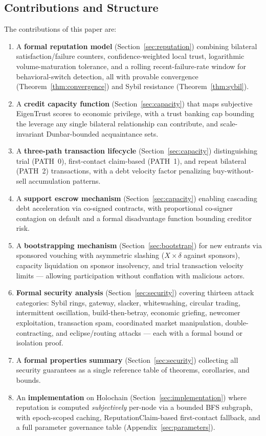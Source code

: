 \documentclass[11pt]{article}
\begin{document}
\subsection{Contributions and Structure}
The contributions of this paper are:
\begin{enumerate}
    \item A \textbf{formal reputation model} (Section~\ref{sec:reputation}) combining bilateral satisfaction/failure counters, confidence-weighted local trust, logarithmic volume-maturation tolerance, and a rolling recent-failure-rate window for behavioral-switch detection, all with provable convergence (Theorem~\ref{thm:convergence}) and Sybil resistance (Theorem~\ref{thm:sybil}).
    \item A \textbf{credit capacity function} (Section~\ref{sec:capacity}) that maps subjective EigenTrust scores to economic privilege, with a trust banking cap bounding the leverage any single bilateral relationship can contribute, and scale-invariant Dunbar-bounded acquaintance sets.
    \item A \textbf{three-path transaction lifecycle} (Section~\ref{sec:capacity}) distinguishing trial (PATH~0), first-contact claim-based (PATH~1), and repeat bilateral (PATH~2) transactions, with a debt velocity factor penalizing buy-without-sell accumulation patterns.
    \item A \textbf{support escrow mechanism} (Section~\ref{sec:capacity}) enabling cascading debt acceleration via co-signed contracts, with proportional co-signer contagion on default and a formal disadvantage function bounding creditor risk.
    \item A \textbf{bootstrapping mechanism} (Section~\ref{sec:bootstrap}) for new entrants via sponsored vouching with asymmetric slashing ($X \times \delta$ against sponsors), capacity liquidation on sponsor insolvency, and trial transaction velocity limits --- allowing participation without conflation with malicious actors.
    \item \textbf{Formal security analysis} (Section~\ref{sec:security}) covering thirteen attack categories: Sybil rings, gateway, slacker, whitewashing, circular trading, intermittent oscillation, build-then-betray, economic griefing, newcomer exploitation, transaction spam, coordinated market manipulation, double-contracting, and eclipse/routing attacks --- each with a formal bound or isolation proof.
    \item A \textbf{formal properties summary} (Section~\ref{sec:security}) collecting all security guarantees as a single reference table of theorems, corollaries, and bounds.
    \item An \textbf{implementation} on Holochain (Section~\ref{sec:implementation}) where reputation is computed \emph{subjectively} per-node via a bounded BFS subgraph, with epoch-scoped caching, ReputationClaim-based first-contact fallback, and a full parameter governance table (Appendix~\ref{sec:parameters}).
\end{enumerate}
\end{document}
